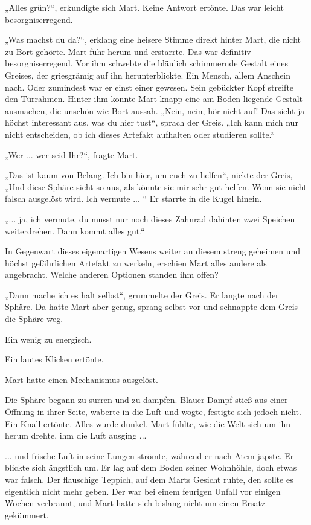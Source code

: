 „Alles grün?“, erkundigte sich Mart. Keine Antwort ertönte. Das war leicht besorgniserregend.

„Was machst du da?“, erklang eine heisere Stimme direkt hinter Mart, die nicht zu Bort gehörte. Mart fuhr herum und erstarrte. Das war definitiv besorgniserregend. Vor ihm schwebte die bläulich schimmernde Gestalt eines Greises, der griesgrämig auf ihn herunterblickte. Ein Mensch, allem Anschein nach. Oder zumindest war er einst einer gewesen. Sein gebückter Kopf streifte den Türrahmen. Hinter ihm konnte Mart knapp eine am Boden liegende Gestalt ausmachen, die unschön wie Bort aussah. „Nein, nein, hör nicht auf! Das sieht ja höchst interessant aus, was du hier tust“, sprach der Greis. „Ich kann mich nur nicht entscheiden, ob ich dieses Artefakt aufhalten oder studieren sollte.“ 

„Wer ... wer seid Ihr?“, fragte Mart.

„Das ist kaum von Belang. Ich bin hier, um euch zu helfen“, nickte der Greis, „Und diese Sphäre sieht so aus, als könnte sie mir sehr gut helfen. Wenn sie nicht falsch ausgelöst wird. Ich vermute ...
“
Er starrte in die Kugel hinein.

„... ja, ich vermute, du musst nur noch dieses Zahnrad dahinten zwei Speichen weiterdrehen. Dann kommt alles gut.“ 

In Gegenwart dieses eigenartigen Wesens weiter an diesem streng geheimen und höchst gefährlichen Artefakt zu werkeln, erschien Mart alles andere als angebracht. Welche anderen Optionen standen ihm offen? 

„Dann mache ich es halt selbst“, grummelte der Greis. Er langte nach der Sphäre. Da hatte Mart aber genug, sprang selbst vor und schnappte dem Greis die Sphäre weg.


Ein wenig zu energisch. 

Ein lautes Klicken ertönte.

Mart hatte einen Mechanismus ausgelöst.

Die Sphäre begann zu surren und zu dampfen. Blauer Dampf stieß aus einer Öffnung in ihrer Seite, waberte in die Luft und wogte, festigte sich jedoch nicht. Ein Knall ertönte. Alles wurde dunkel. Mart fühlte, wie die Welt sich um ihn herum drehte, ihm die Luft ausging ...


... und frische Luft in seine Lungen strömte, während er nach Atem japste. Er blickte sich ängstlich um. Er lag auf dem Boden seiner Wohnhöhle, doch etwas war falsch. Der flauschige Teppich, auf dem Marts Gesicht ruhte, den sollte es eigentlich nicht mehr geben. Der war bei einem feurigen Unfall vor einigen Wochen verbrannt, und Mart hatte sich bislang nicht um einen Ersatz gekümmert. 

